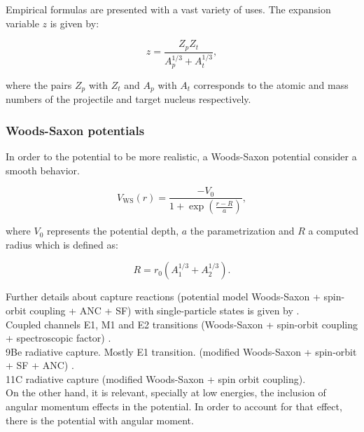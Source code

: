 \documentclass[openany]{book}
\begin{document}
Empirical formulas are presented with a vast variety of uses. The expansion variable $z$ is given by:

\begin{equation}\label{eq:potential_empirical_z}
	z = \frac{Z_pZ_t }{A_p^{1/3} + A_t^{1/3}},
\end{equation}

where the pairs $Z_p$ with $Z_t$ and $A_p$ with $A_t$ corresponds to the atomic and mass numbers of the projectile and target nucleus respectively.

\subsubsection{Woods-Saxon potentials} \label{sub:potential_effective_woodsSaxon}

In order to the potential to be more realistic, a Woods-Saxon potential consider a smooth behavior.

\begin{equation} \label{eq:potential_WoodsSaxon}
	V_{\mathrm{WS}}(r) = \frac{-V_0}{1 + \exp  \left({\frac{r-R}{a}}\right)},
\end{equation}

where $V_0$ represents the potential depth, $a$ the parametrization and $R$ a computed radius which is defined as: 

\begin{equation} \label{eq:potential_WoodsSaxon_radius}
	R = r_0(A_1^{1/3} + A_2^{1/3}).
\end{equation}

Further details about capture reactions (potential model Woods-Saxon + spin-orbit coupling + ANC + SF) with single-particle states is given by \cite{huang_bertulani_guimaraes_2010}. \\

Coupled channels  E1, M1 and E2 transitions (Woods-Saxon + spin-orbit coupling + spectroscopic factor) \cite{bertulani_1996}. \\

9Be radiative capture. Mostly E1 transition.  (modified Woods-Saxon + spin-orbit + SF + ANC) \cite{kabir_nabi_2021}. \\

11C radiative capture (modified Woods-Saxon + spin orbit coupling)\cite{kabir_irgaziev_nabi_sagheer_2022}. \\

On the other hand, it is relevant, specially at low energies, the inclusion of angular momentum effects in the potential. In order to account for that effect, there is the potential with angular moment. \\
\end{document}
